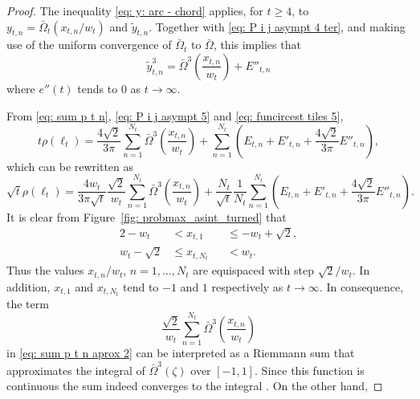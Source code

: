 \documentclass[12pt, a4paper]{article}
\newcommand{\probmax}{\rho} %
\newcommand{\len}{\ell} %
\newcommand{\tiles}{t} %
\newcommand{\funcircesc}{\bar \Omega}
\begin{document}
\begin{proof}

The inequality \eqref{eq: y: arc - chord} applies, for $\tiles \geq 4$, to $y_{\tiles,n} = \funcircesc_\tiles(x_{\tiles,n}/w_\tiles)$ and $\tilde y_{\tiles,n}$. Together with \eqref{eq: P i j asympt 4 ter}, and making use of the uniform convergence of $\funcircesc_\tiles$ to $\funcircesc$, 
this implies that
\begin{equation}
\label{eq: funcircest tiles 5}
\tilde y_{\tiles,n}^3 = \funcircesc^3\left( \frac{x_{\tiles,n}} {w_\tiles} \right) + E''_{\tiles,n}
\end{equation}
where $e''(\tiles)$ tends to $0$ as $\tiles \rightarrow \infty$.

From \eqref{eq: sum p t n}, \eqref{eq: P i j asympt 5} and \eqref{eq: funcircest tiles 5},
\begin{equation}
\label{eq: sum p t n aprox 1}
\tiles \probmax(\len_\tiles) = \frac{4 \sqrt{2}} {3\pi} \sum_{n=1}^{N_\tiles} \funcircesc^3 \left( \frac{x_{\tiles,n}}{w_\tiles} \right) + \sum_{n=1}^{N_\tiles} \left(E_{\tiles,n} + E'_{\tiles,n} + \frac{4 \sqrt{2}} {3\pi} E''_{\tiles,n} \right),
\end{equation}
which can be rewritten as
\begin{equation}
\label{eq: sum p t n aprox 2}
\sqrt{\tiles} \probmax(\len_\tiles) = \frac{4 w_\tiles} {3\pi\sqrt{\tiles}} \frac {\sqrt{2}} {w_\tiles} \sum_{n=1}^{N_\tiles} \funcircesc^3 \left( \frac{x_{\tiles,n}}{w_\tiles} \right)
+ \frac{{N_\tiles}} {\sqrt{t}} \frac 1 {N_\tiles} \sum_{n=1}^{N_\tiles} \left(E_{\tiles,n} + E'_{\tiles,n} + \frac{4 \sqrt{2}} {3\pi} E''_{\tiles,n} \right).
\end{equation}
It is clear from Figure~\ref{fig: probmax_asint_turned} that
\begin{alignat}{2}
-w_\tiles &< x_{\tiles,1} && \leq -w_\tiles + \sqrt{2}, \\
w_\tiles - \sqrt{2} &\leq x_{\tiles,N_\tiles} && < w_\tiles.
\end{alignat}
Thus the values $x_{\tiles,n}/w_\tiles$, $n=1,\ldots,N_\tiles$ are equispaced with step $\sqrt{2}/w_\tiles$. In addition, $x_{\tiles,1}$ and $x_{\tiles,N_\tiles}$ tend to $-1$ and $1$  respectively as $\tiles \rightarrow \infty$. In consequence, the term
\[
\frac{\sqrt{2}}{w_\tiles} \sum_{n=1}^{N_\tiles} \funcircesc^3 \left( \frac{x_{\tiles,n}}{w_\tiles} \right)
\]
in \eqref{eq: sum p t n aprox 2} can be interpreted as a Riemmann sum that approximates the integral of $\funcircesc^3(\zeta)$ over $[-1,1]$. Since this function is continuous the sum indeed converges to the integral \cite[section~7.2]{Abbott15}. On the other hand,

\end{proof}
\end{document}
